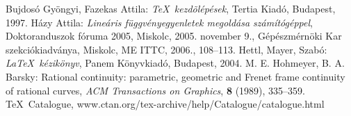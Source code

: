 \begin{thebibliography}{x}
 Bujdosó Gyöngyi, Fazekas Attila: {\em\TeX\ kezdõlépések}, Tertia Kiadó, Budapest, 1997.
 Házy Attila: {\em Lineáris függvényegyenletek megoldása számítógéppel}, Doktoranduszok fóruma 2005, Miskolc, 2005. november 9., Gépészmérnöki Kar szekciókiadványa, Miskolc, ME ITTC, 2006., 108--113.
 Hettl, Mayer, Szabó: {\em \LaTeX\ kézikönyv}, Panem Könyvkiadó, Budapest, 2004.
 M. E. Hohmeyer, B. A. Barsky: Rational continuity: parametric, geometric and Frenet frame
continuity of rational curves, {\em ACM Transactions on Graphics}, \textbf{8} (1989), 335--359.
 \TeX\ Catalogue, {\ttfamily www.ctan.org/tex-archive/help/Catalogue/catalogue.html} 
\end{thebibliography}
